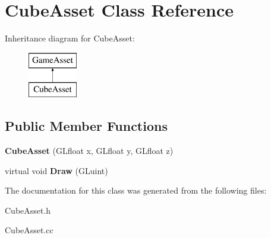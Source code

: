 \hypertarget{classCubeAsset}{}\section{Cube\+Asset Class Reference}
\label{classCubeAsset}
Inheritance diagram for Cube\+Asset\+:\begin{figure}[H]
\begin{center}
\leavevmode
\includegraphics[height=2.000000cm]{classCubeAsset}
\end{center}
\end{figure}
\subsection*{Public Member Functions}
\begin{DoxyCompactItemize}
\item 
\hypertarget{classCubeAsset_a0252e564114a3cda7e3911ef95742a34}{}{\bfseries Cube\+Asset} (G\+Lfloat x, G\+Lfloat y, G\+Lfloat z)\label{classCubeAsset_a0252e564114a3cda7e3911ef95742a34}

\item 
\hypertarget{classCubeAsset_a1af568486056e254ffcf98fd99947bfe}{}virtual void {\bfseries Draw} (G\+Luint)\label{classCubeAsset_a1af568486056e254ffcf98fd99947bfe}

\end{DoxyCompactItemize}


The documentation for this class was generated from the following files\+:\begin{DoxyCompactItemize}
\item 
Cube\+Asset.\+h\item 
Cube\+Asset.\+cc\end{DoxyCompactItemize}
